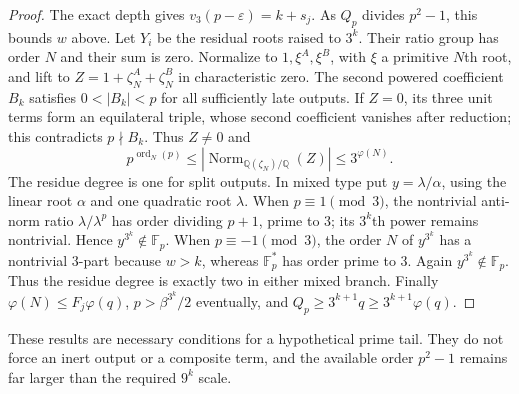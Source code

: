 \documentclass[11pt,a4paper]{article}
\theoremstyle{definition}\newtheorem{definition}[theorem]{Definition}
\theoremstyle{remark}\newtheorem{remark}[theorem]{Remark}
\begin{document}
\begin{proof}
The exact depth gives $v_3(p-\varepsilon)=k+s_j$. As $Q_p$ divides
$p^2-1$, this bounds $w$ above. Let $Y_i$ be the residual roots
raised to $3^k$. Their ratio group has order $N$ and their sum is
zero. Normalize to $1,\xi^A,\xi^B$, with $\xi$ a primitive $N$th
root, and lift to $Z=1+\zeta_N^A+\zeta_N^B$ in characteristic zero.
The second powered coefficient $B_k$ satisfies
$0<|B_k|<p$ for all sufficiently late outputs. If $Z=0$, its three
unit terms form an equilateral triple, whose second coefficient
vanishes after reduction; this contradicts $p\nmid B_k$.
Thus $Z\ne0$ and
\[
 p^{\operatorname{ord}_N(p)}
 \le|\operatorname{Norm}_{\mathbb Q(\zeta_N)/\mathbb Q}(Z)|
 \le3^{\varphi(N)}.
\]
The residue degree is one for split outputs. In mixed type put
$y=\lambda/\alpha$, using the linear root $\alpha$ and one quadratic
root $\lambda$. When $p\equiv1\pmod3$, the nontrivial anti-norm
ratio $\lambda/\lambda^p$ has order dividing $p+1$, prime to $3$;
its $3^k$th power remains nontrivial. Hence $y^{3^k}\notin\mathbb F_p$.
When $p\equiv-1\pmod3$, the order $N$ of $y^{3^k}$ has a nontrivial
$3$-part because $w>k$, whereas $\mathbb F_p^*$ has order prime to
$3$. Again $y^{3^k}\notin\mathbb F_p$. Thus the residue degree is
exactly two in either mixed branch. Finally
$\varphi(N)\le F_j\varphi(q)$,
$p>\beta^{3^k}/2$ eventually, and
$Q_p\ge3^{k+1}q\ge3^{k+1}\varphi(q)$.
\end{proof}

These results are necessary conditions for a hypothetical prime tail.
They do not force an inert output or a composite term, and the available
order $p^2-1$ remains far larger than the required $9^k$ scale.
\end{document}
